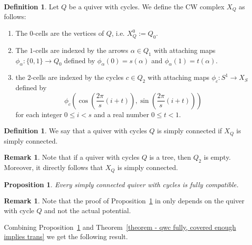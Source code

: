 \documentclass[a4paper, reqno]{amsart}
\newtheorem{myprop}[mythm]{Proposition}
\theoremstyle{definition}
\newtheorem{mydef}[mythm]{Definition}
\newtheorem{myrem}[mythm]{Remark}
\begin{document}
\begin{mydef}\cite[Definition 8.1]{HerschendOsamu2011quiverwithpotential}
	Let $Q$ be a quiver with cycles. We define the CW complex $X_Q$ as follows:
	\begin{enumerate}
		\item The $0$-cells are the vertices of $Q$, i.e. $X_Q^0 := Q_0$.
		\item The $1$-cells are indexed by the arrows $\alpha\in Q_1$ with attaching maps $\phi_\alpha: \{0, 1\}\to Q_0$ defined by $\phi_\alpha(0) = s(\alpha)$ and $\phi_\alpha(1) = t(\alpha)$.
		\item the $2$-cells are indexed by the cycles $c\in Q_2$ with attaching maps $\phi_c: S^1 \to X_S$ defined by
		\begin{equation*}
			\phi_c\left(\cos\left(\frac{2\pi}{s}(i+t) \right), \sin\left(\frac{2\pi}{s}(i+t) \right) \right)
		\end{equation*}
		for each integer $0\le i< s$ and a real number $0\le t<1$.
	\end{enumerate}
\end{mydef}

\begin{mydef}\cite[Definition 8.5]{HerschendOsamu2011quiverwithpotential}
	We say that a quiver with cycles $Q$ is simply connected if $X_Q$ is simply connected.
\end{mydef}

\begin{myrem}
	Note that if a quiver with cycles $Q$ is a tree, then $Q_2$ is empty. Moreover, it directly follows that $X_Q$ is simply connected.
\end{myrem}

\begin{myprop}\label{proposition - simply conn implies fully comp}\cite[Proposition 8.6]{HerschendOsamu2011quiverwithpotential}
	Every simply connected quiver with cycles is fully compatible.
\end{myprop}

\begin{myrem}
	Note that the proof of Proposition~\ref{proposition - simply conn implies fully comp} in \cite{HerschendOsamu2011quiverwithpotential} only depends on the quiver with cycle $Q$ and not the actual potential.
\end{myrem}

Combining Proposition~\ref{proposition - simply conn implies fully comp} and Theorem~\ref{theorem - qwc fully, covered enough implies trans} we get the following result.
\end{document}
